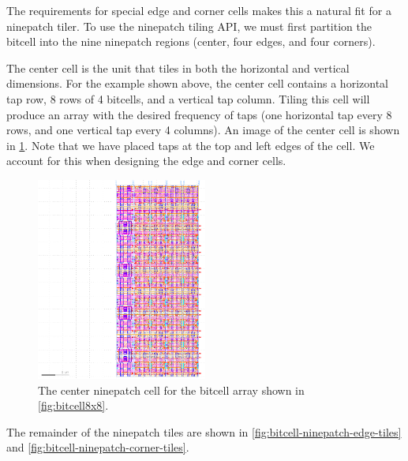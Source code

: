 The requirements for special edge and corner cells makes this a natural fit for a ninepatch tiler.
To use the ninepatch tiling API, we must first partition the bitcell into the nine ninepatch regions (center, four edges, and four corners).

The center cell is the unit that tiles in both the horizontal and vertical dimensions. For the example shown above,
the center cell contains a horizontal tap row, 8 rows of 4 bitcells, and a vertical tap column. Tiling this cell
will produce an array with the desired frequency of taps (one horizontal tap every 8 rows, and one vertical tap every 4 columns).
An image of the center cell is shown in \ref{fig:bitcell-center}. Note that we have placed taps at the top and left edges of the cell.
We account for this when designing the edge and corner cells.

\begin{figure}[H] \centering
\includegraphics[width=0.5\textwidth]{figures/bitcell_center.png}
\caption{The center ninepatch cell for the bitcell array shown in \ref{fig:bitcell8x8}. \label{fig:bitcell-center}}
\end{figure}

The remainder of the ninepatch tiles are shown in \ref{fig:bitcell-ninepatch-edge-tiles}
and \ref{fig:bitcell-ninepatch-corner-tiles}.

